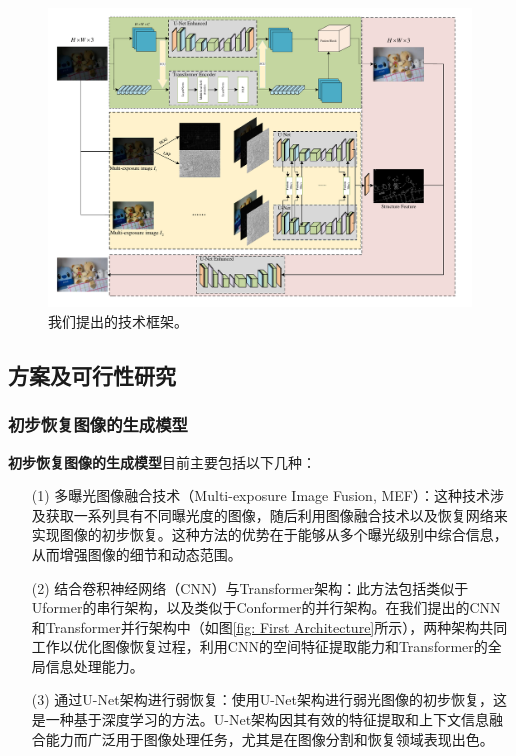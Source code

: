 \documentclass[a4paper]{ctexart}
\begin{document}
	\begin{figure}[htb]
		\centering 
		\includegraphics[width=\columnwidth]{picture/LLIE/My Architecture/Total architecture}
		\caption{
			\label{fig: Total Architecture} 
			我们提出的技术框架。
		}
	\end{figure}
	\FloatBarrier
	
	\subsection{方案及可行性研究}
	
	\subsubsection{初步恢复图像的生成模型}
	
	\textbf{初步恢复图像的生成模型}目前主要包括以下几种：
	
	\begin{itemize}
		\item[(1)] 
		多曝光图像融合技术（Multi-exposure Image Fusion, MEF）：这种技术涉及获取一系列具有不同曝光度的图像，随后利用图像融合技术以及恢复网络来实现图像的初步恢复。这种方法的优势在于能够从多个曝光级别中综合信息，从而增强图像的细节和动态范围\cite{burt1984pyramid}。
		
		\item[(2)]
		结合卷积神经网络（CNN）与Transformer架构：此方法包括类似于Uformer\cite{wang2022uformer}的串行架构，以及类似于Conformer的并行架构。在我们提出的CNN和Transformer并行架构中（如图\ref{fig: First Architecture}所示），两种架构共同工作以优化图像恢复过程，利用CNN的空间特征提取能力和Transformer的全局信息处理能力。
		
		\item[(3)]
		通过U-Net架构进行弱恢复：使用U-Net架构进行弱光图像的初步恢复，这是一种基于深度学习的方法。U-Net架构因其有效的特征提取和上下文信息融合能力而广泛用于图像处理任务，尤其是在图像分割和恢复领域表现出色。
	\end{itemize}	
	
\end{document}
